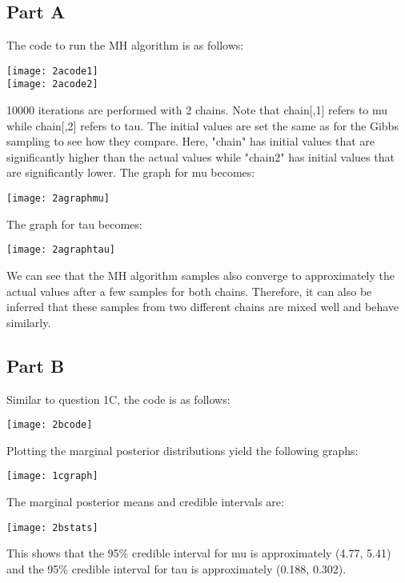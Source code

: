\documentclass{article}
\begin{document}
\subsection{Part A}
The code to run the MH algorithm is as follows:
\begin{center}
\texttt{[image: 2acode1]}\\
\texttt{[image: 2acode2]}\\
\end{center}
10000 iterations are performed with 2 chains. Note that chain[,1] refers to mu while chain[,2] refers to tau. The initial values are set the same as for the Gibbs sampling to see how they compare. Here, "chain" has initial values that are significantly higher than the actual values while "chain2" has initial values that are significantly lower. The graph for mu becomes:\\
\begin{center}
\texttt{[image: 2agraphmu]}\\
\end{center}
The graph for tau becomes:\\
\begin{center}
\texttt{[image: 2agraphtau]}\\
\end{center}
We can see that the MH algorithm samples also converge to approximately the actual values after a few samples for both chains. Therefore, it can also be inferred that these samples from two different chains are mixed well and behave similarly.

\subsection{Part B}
Similar to question 1C, the code is as follows:\\
\begin{center}
\texttt{[image: 2bcode]}
\end{center}
Plotting the marginal posterior distributions yield the following graphs:\\
\begin{center}
\texttt{[image: 1cgraph]}
\end{center}
The marginal posterior means and credible intervals are:\\
\begin{center}
\texttt{[image: 2bstats]}
\end{center}
This shows that the 95\% credible interval for mu is approximately (4.77, 5.41) and the 95\% credible interval for tau is approximately (0.188, 0.302).\\
\end{document}
